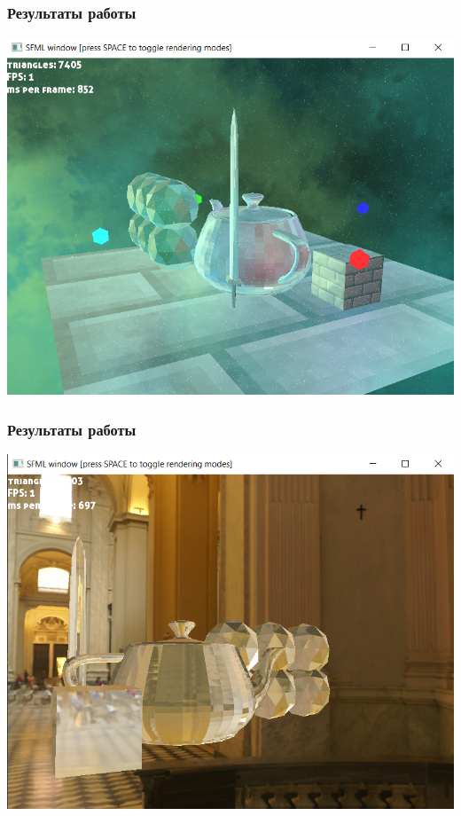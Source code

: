 \documentclass{beamer}
\begin{document}
\begin{frame}
	\frametitle{Результаты работы}
		\includegraphics[scale=0.55]{img.png} 
		
\end{frame}
\begin{frame}
	\frametitle{Результаты работы}
	\includegraphics[scale=0.45]{img1.png} 
	
\end{frame}
\end{document}
